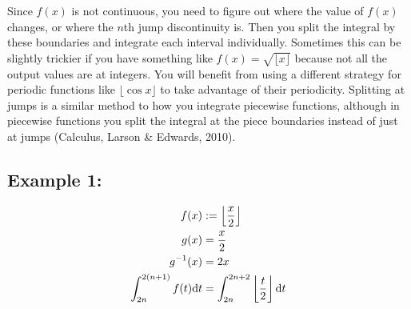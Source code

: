 \documentclass[12pt]{article}
\begin{document}
	\indent\indent Since $f(x)$ is not continuous, you need to figure out where the value of $f(x)$ changes,
	or where the $n$th jump discontinuity is. Then you split the integral by these boundaries and integrate
	each interval individually. Sometimes this can be slightly trickier if you have something like
	$f(x)=\sqrt{\lfloor x\rfloor}$ because not all the output values are at integers. You will benefit from
	using a different strategy for periodic functions like $\lfloor\cos x\rfloor$ to take advantage of
	their periodicity. Splitting at jumps is a similar method to how you integrate piecewise functions,
	although in piecewise functions you split the integral at the piece boundaries instead of just at jumps
	(Calculus, Larson \& Edwards, 2010).

	\subsection*{Example 1:}

		\begin{minipage}{0.5\textwidth}
			\begin{align*}
				f(x) & := \left\lfloor\frac x2\right\rfloor\\
				g(x) & = \frac x2\\
				g^{-1}(x) & = 2x\\
				\int_{2n}^{2(n+1)}f(t)\text dt & = \int_{2n}^{2n+2}\left\lfloor\frac t2\right\rfloor\text dt
			\end{align*}
		\end{minipage}
		\hfill
		\begin{minipage}{0.5\textwidth}
		\end{minipage}
		\vspace{0.2em}
\end{document}
